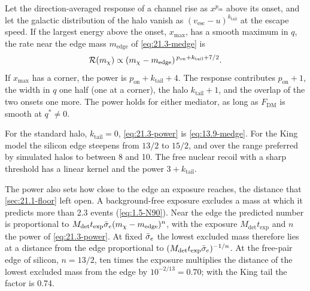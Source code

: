 \begin{keyresult}
Let the direction-averaged response of a channel rise as $x^{p_{\mathrm{on}}}$ above its onset, and let the galactic distribution of the halo vanish as $(v_{\mathrm{esc}} - u)^{k_{\mathrm{tail}}}$ at the escape speed. If the largest energy above the onset, $x_{\mathrm{max}}$, has a smooth maximum in $q$, the rate near the edge mass $m_{\mathrm{edge}}$ of \cref{eq:21.3-medge} is
\begin{equation}
  \mathcal{R}(m_{\chi}) \propto (m_{\chi} - m_{\mathrm{edge}})^{\,p_{\mathrm{on}} + k_{\mathrm{tail}} + 7/2} .
  \label{eq:21.3-power}
\end{equation}
If $x_{\mathrm{max}}$ has a corner, the power is $p_{\mathrm{on}} + k_{\mathrm{tail}} + 4$. The response contributes $p_{\mathrm{on}} + 1$, the width in $q$ one half (one at a corner), the halo $k_{\mathrm{tail}} + 1$, and the overlap of the two onsets one more. The power holds for either mediator, as long as $F_{\mathrm{DM}}$ is smooth at $q^* \neq 0$.
\end{keyresult}

For the standard halo, $k_{\mathrm{tail}} = 0$, \cref{eq:21.3-power} is \cref{eq:13.9-medge}. For the King model the silicon edge steepens from $13/2$ to $15/2$, and over the range preferred by simulated halos to between 8 and 10. The free nuclear recoil with a sharp threshold has a linear kernel and the power $3 + k_{\mathrm{tail}}$.

The power also sets how close to the edge an exposure reaches, the distance that \cref{sec:21.1-floor} left open. A background-free exposure excludes a mass at which it predicts more than 2.3 events (\cref{eq:1.5-N90}). Near the edge the predicted number is proportional to $M_{\mathrm{det}}t_{\mathrm{exp}}\bar{\sigma}_{e}(m_{\chi} - m_{\mathrm{edge}})^{n}$, with the exposure $M_{\mathrm{det}}t_{\mathrm{exp}}$ and $n$ the power of \cref{eq:21.3-power}. At fixed $\bar{\sigma}_{e}$ the lowest excluded mass therefore lies at a distance from the edge proportional to $(M_{\mathrm{det}}t_{\mathrm{exp}}\bar{\sigma}_{e})^{-1/n}$. At the free-pair edge of silicon, $n = 13/2$, ten times the exposure multiplies the distance of the lowest excluded mass from the edge by $10^{-2/13} = 0.70$; with the King tail the factor is 0.74.


